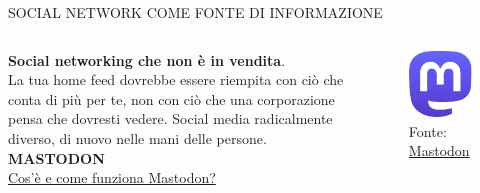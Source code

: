 \documentclass[aspectratio=1610]{beamer}
\begin{document}
\begin{frame}{SOCIAL NETWORK COME FONTE DI INFORMAZIONE}
    \begin{columns}
            \justifying
            \textbf{Social networking che non è in vendita}.\\
            La tua home feed dovrebbe essere riempita con ciò che conta di più per te, 
            non con ciò che una corporazione pensa che dovresti vedere. Social media 
            radicalmente diverso, di nuovo nelle mani delle persone.\\
            \bigskip
            \tiny{\textbf{MASTODON}}\\
            \tiny{\href{https://joinmastodon.org/it}{Cos'è e come funziona Mastodon?}}\\
            \begin{figure}
                \includegraphics[width=\linewidth]{img/mastodon.png}
                \caption{{Fonte: \href{https://joinmastodon.org/it}{Mastodon}}}
            \end{figure}
    \end{columns}
\end{frame}
\end{document}
